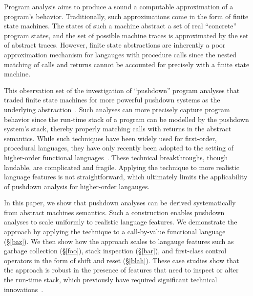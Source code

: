Program analysis aims to produce a sound a computable approximation of
a program's behavior.  Traditionally, such approximations come in the
form of finite state machines.  The states of such a machine abstract
a set of real ``concrete'' program states, and the set of possible
machine traces is approximated by the set of abstract traces.
However, finite state abstractions are inherently a poor approximation
mechanism for langauges with procedure calls since the nested matching
of calls and returns cannot be accounted for precisely with a finite
state machine.

This observation set of the investigation of ``pushdown'' program
analyses that traded finite state machines for more powerful pushdown
systems as the underlying
abstraction~\cite{first-order,oo,pushdown-stuff}.  Such analyses can
more precisely capture program behavior since the run-time stack of a
program can be modelled by the pushdown system's stack, thereby
properly matching calls with returns in the abstract semantics.  While
such techniques have been widely used for first-order, procedural
languages, they have only recently been adopted to the setting of
higher-order functional languages~\cite{usual,suspects}.
%
These technical breakthroughs, though laudable, are complicated and
fragile.  Applying the technique to more realistic language features
is not straightforward, which ultimately limits the applicability of
pushdown analysis for higher-order langauges.

In this paper, we show that pushdown analyses can be derived
systematically from abstract machines semantics.  Such a construction
enables pushdown analyses to scale uniformly to realistic language
features.  We demonstrate the approach by applying the technique to a
call-by-value functional language (\S\ref{baz}).  We then show how
the approach scales to langauge features such as garbage collection
(\S\ref{foo}), stack inspection (\S\ref{bar}), and first-class
control operators in the form of shift and reset (\S\ref{blah}).
%
These case studies show that the approach is robust in the presence of
features that need to inspect or alter the run-time stack, which
previously have required significant technical
innovations~\cite{callcc,introspective}.
